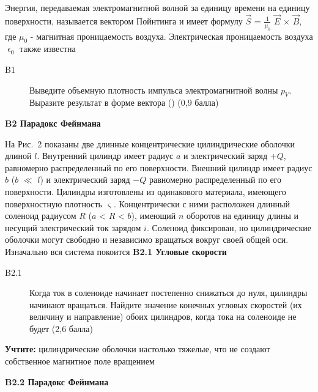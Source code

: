 \documentclass[a4paper, 14pt]{article}
\begin{document}
    \vspace{\baselineskip}
    Энергия, передаваемая электромагнитной волной за единицу времени на единицу поверхности, называется вектором
    Пойнтинга и имеет формулу $\vec{S}$ = $\frac{1}{\mu_0}$ $\vec{E}$ $\times$ $\vec{B}$, где $\mu_0$ - магнитная
    проницаемость воздуха.
    Электрическая проницаемость воздуха ${\upvarepsilon_0}$ также известна

    \begin{description}
        \item [B1] Выведите объемную плотность импульса электромагнитной
        волны $p_V$.
        Выразите результат в форме вектора () (0,9 балла)
    \end{description}

    \vspace{\baselineskip}
    \textbf{B2 Парадокс Фейнмана}

    \vspace{\baselineskip}
    На Рис.~2 показаны две длинные концентрические цилиндрические оболочки длиной $l$.
    Внутренний цилиндр имеет
    радиус $a$ и электрический заряд $+Q$, равномерно распределенный по его поверхности.
    Внешний цилиндр имеет радиус $b$ ($b$ $\ll$ $l$)
    и электрический заряд $-Q$ равномерно распределенный по его поверхности.
    Цилиндры изготовлены из одинакового материала, имеющего поверхностную плотность $\upvarsigma$.
    Концентрически с ними расположен длинный соленоид радиусом $R$ ($a$ < $R$ < $b$), имеющий $n$ оборотов на единицу
    длины и несущий электрический ток зарядом $i$.
    Соленоид фиксирован, но цилиндрические оболочки могут свободно и независимо вращаться вокруг своей общей оси.
    Изначально вся система покоится
    \newpage
    \vspace{\baselineskip}
    \textbf{B2.1 Угловые скорости}

    \begin{description}
        \item [B2.1] Когда ток в соленоиде начинает постепенно снижаться до нуля, цилиндры начинают вращаться.
        Найдите значение конечных угловых скоростей (их величину и направление) обоих цилиндров, когда тока на
        соленоиде не будет (2,6 балла)
    \end{description}

    \textbf{Учтите:} цилиндрические оболочки настолько тяжелые, что не создают собственное магнитное поле вращением

    \vspace{\baselineskip}
    \textbf{B2.2 Парадокс Фейнмана}
\end{document}
